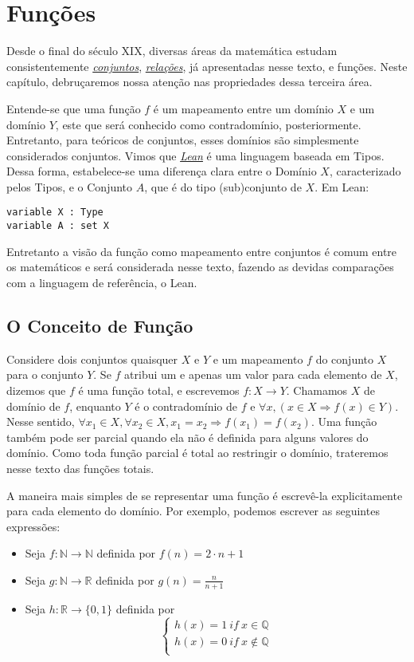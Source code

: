 \chapter{Funções}

Desde o final do século XIX, diversas áreas da matemática
estudam consistentemente \textit{\hyperlink{chapter.4}{conjuntos}},
\textit{\hyperlink{chapter.5}{relações}}, já apresentadas
nesse texto, e funções. Neste capítulo, debruçaremos nossa
atenção nas propriedades dessa terceira área.

Entende-se que uma função $f$ é um mapeamento entre um
domínio $X$ e um domínio $Y$, este que será conhecido como
contradomínio, posteriormente. Entretanto, para teóricos
de conjuntos, esses domínios são simplesmente considerados
conjuntos. Vimos que \textit{\hyperlink{chapter.2}{Lean}} é uma
linguagem baseada em Tipos. Dessa forma, estabelece-se uma
diferença clara entre o Domínio $X$, caracterizado pelos Tipos, e
o Conjunto $A$, que é do tipo (sub)conjunto de $X$. Em Lean:
\begin{lstlisting}
variable X : Type
variable A : set X
\end{lstlisting}

Entretanto a visão da função como mapeamento entre conjuntos
é comum entre os matemáticos e será considerada nesse texto,
fazendo as devidas comparações com a linguagem de referência,
o Lean.

\section{O Conceito de Função}

Considere dois conjuntos quaisquer $X$ e $Y$ e um mapeamento $f$
do conjunto $X$ para o conjunto $Y$. Se $f$ atribui um e apenas
um valor para cada elemento de $X$, dizemos que $f$ é uma função total, e
escrevemos $f: X \to Y$.  Chamamos $X$ de domínio de $f$, enquanto
$Y$ é o contradomínio de $f$ e $\forall x, (x \in X  \Rightarrow f(x) \in Y)$.
Nesse sentido, $\forall x_1 \in X, \forall x_2 \in X, x_1 = x_2 \Rightarrow f(x_1) = f(x_2)$.
Uma função também pode ser parcial quando ela não é definida para alguns valores
do domínio. Como toda função parcial é total ao restringir o domínio, trateremos
nesse texto das funções totais.

A maneira mais simples de se representar uma função é escrevê-la explicitamente
para cada elemento do domínio. Por exemplo, podemos escrever as seguintes expressões:

\begin{itemize}
    \item Seja $f: \mathbb{N} \to \mathbb{N}$ definida por
    $f(n) = 2\cdot n + 1$
    \item Seja $g : \mathbb{N} \to \mathbb{R}$ definida por
    $g(n) = \frac{n}{n+1}$
    \item Seja $h : \mathbb{R} \to \{0,1\}$ definida por
    $$\left \{ \begin{array}{c}
    h(x) = 1 ~if~x \in \mathbb{Q} \\
    h(x) = 0 ~ if ~ x \not \in \mathbb{Q} \\
    \end{array}
    \right. $$
 \end{itemize}

